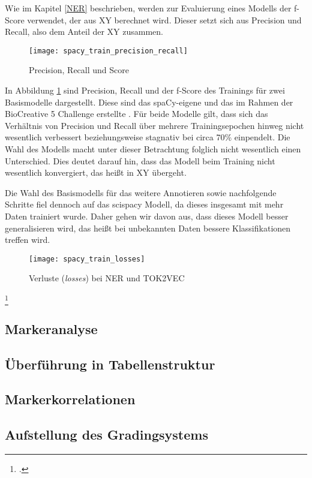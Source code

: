 Wie im Kapitel \ref{NER} beschrieben, werden zur Evaluierung eines Modells der f-Score verwendet, der aus XY berechnet wird. Dieser setzt sich aus Precision und Recall, also dem Anteil der XY zusammen.

\begin{figure}[H]
    \centering
    \caption[]{Precision, Recall und Score}
	\label{fig:TrainPrecisionRecall}
    \texttt{[image: spacy\_train\_precision\_recall]}
\end{figure}
In Abbildung \ref{fig:TrainPrecisionRecall} sind Precision, Recall und der f-Score des Trainings für zwei Basismodelle dargestellt. Diese sind das spaCy-eigene \grqq{} und das im Rahmen der BioCreative 5 Challenge erstellte \grqq. Für beide Modelle gilt, dass sich das Verhältnis von Precision und Recall über mehrere Trainingsepochen hinweg nicht wesentlich verbessert beziehungsweise stagnativ bei circa 70\% einpendelt. Die Wahl des Modells macht unter dieser Betrachtung folglich nicht wesentlich einen Unterschied. Dies deutet darauf hin, dass das Modell beim Training nicht wesentlich konvergiert, das heißt in XY übergeht.

Die Wahl des Basismodells für das weitere Annotieren sowie nachfolgende Schritte fiel dennoch auf das scispacy Modell, da dieses insgesamt mit mehr Daten trainiert wurde. Daher gehen wir davon aus, dass dieses Modell besser generalisieren wird, das heißt bei unbekannten Daten bessere Klassifikationen treffen wird.
\begin{figure}[H]
    \centering
    \caption[]{Verluste (\textit{losses}) bei \ac{NER} und TOK2VEC}
	\label{fig:TrainLosses}
    \texttt{[image: spacy\_train\_losses]}
\end{figure}
\footcite[]{tsai2006}

\subsection{Markeranalyse}
\subsection{Überführung in Tabellenstruktur}
\subsection{Markerkorrelationen}
\subsection{Aufstellung des Gradingsystems}

